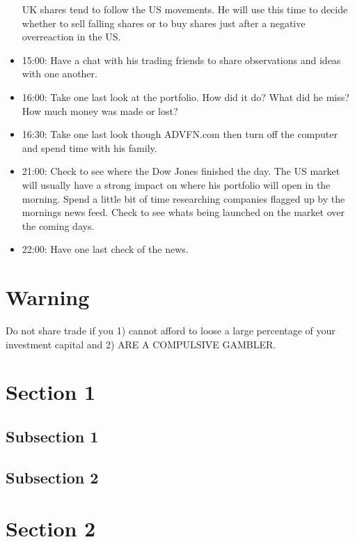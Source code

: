 \begin{itemize}
UK shares tend to follow the US movements.
He will use this time to decide whether to sell falling shares or to buy shares just after a negative overreaction in the US.
\item 15:00: Have a chat with his trading friends to share observations and ideas with one another.
\item 16:00: Take one last look at the portfolio.
How did it do?
What did he miss?
How much money was made or lost?
\item 16:30: Take one last look though ADVFN.com then turn off the computer and spend time with his family.
\item 21:00: Check to see where the Dow Jones finished the day.
The US market will usually have a strong impact on where his portfolio will open in the morning.
Spend a little bit of time researching companies flagged up by the mornings news feed.
Check to see whats being launched on the market over the coming days.
\item 22:00: Have one last check of the news.
\end{itemize}

\section*{Warning}
Do not share trade if you 1) cannot afford to loose a large percentage of your investment capital and 2) ARE A COMPULSIVE GAMBLER.

\section*{Section 1}


\subsection*{Subsection 1}



\subsection*{Subsection 2}



\section*{Section 2}





